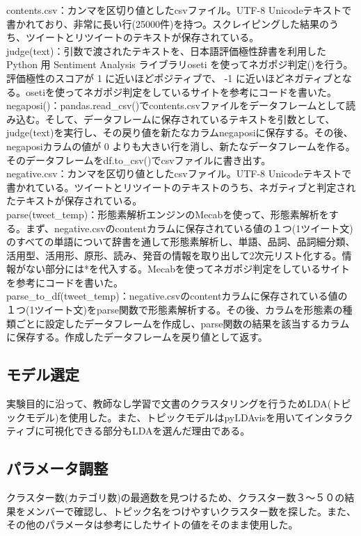 \documentclass[a4paper, 11pt, titlepage]{jsarticle}
\begin{document}
contents.csv：カンマを区切り値としたcsvファイル。UTF-8 Unicodeテキストで書かれており、非常に長い行(25000件)を持つ。スクレイピングした結果のうち、ツイートとリツイートのテキストが保存されている。\\
judge(text)：引数で渡されたテキストを、日本語評価極性辞書を利用したPython 用 Sentiment Analysis ライブラリoseti を使ってネガポジ判定()を行う\cite{negaposi1}。評価極性のスコアが 1 に近いほどポジティブで、 -1 に近いほどネガティブとなる。osetiを使ってネガポジ判定をしているサイトを参考にコードを書いた\cite{negaposi2}。\\
negaposi()：pandas.read\_csv()でcontents.csvファイルをデータフレームとして読み込む。そして、データフレームに保存されているテキストを引数として、judge(text)を実行し、その戻り値を新たなカラムnegaposiに保存する。その後、negaposiカラムの値が 0 よりも大きい行を消し、新たなデータフレームを作る。そのデータフレームをdf.to\_csv()でcsvファイルに書き出す。\\
negative.csv：カンマを区切り値としたcsvファイル。UTF-8 Unicodeテキストで書かれている。ツイートとリツイートのテキストのうち、ネガティブと判定されたテキストが保存されている。\\
parse(tweet\_temp)：形態素解析エンジンのMecabを使って、形態素解析をする\cite{keitaiso1}。まず、negative.csvのcontentカラムに保存されている値の１つ(1ツイート文)のすべての単語について辞書を通して形態素解析し、単語、品詞、品詞細分類、活用型、活用形、原形、読み、発音の情報を取り出して2次元リスト化する。情報がない部分には*を代入する。Mecabを使ってネガポジ判定をしているサイトを参考にコードを書いた\cite{keitaiso2}。\\
parse\_to\_df(tweet\_temp)：negative.csvのcontentカラムに保存されている値の１つ(1ツイート文)をparse関数で形態素解析する。その後、カラムを形態素の種類ごとに設定したデータフレームを作成し、parse関数の結果を該当するカラムに保存する。作成したデータフレームを戻り値として返す。\\

\subsection{モデル選定}
実験目的に沿って、教師なし学習で文書のクラスタリングを行うためLDA(トピックモデル)を使用した。また、トピックモデルはpyLDAvisを用いてインタラクティブに可視化できる部分もLDAを選んだ理由である。 

\subsection{パラメータ調整}
クラスター数(カテゴリ数)の最適数を見つけるため、クラスター数３〜５０の結果をメンバーで確認し、トピック名をつけやすいクラスター数を探した。また、その他のパラメータは参考にしたサイトの値をそのまま使用した\cite{LDA}。
\end{document}
